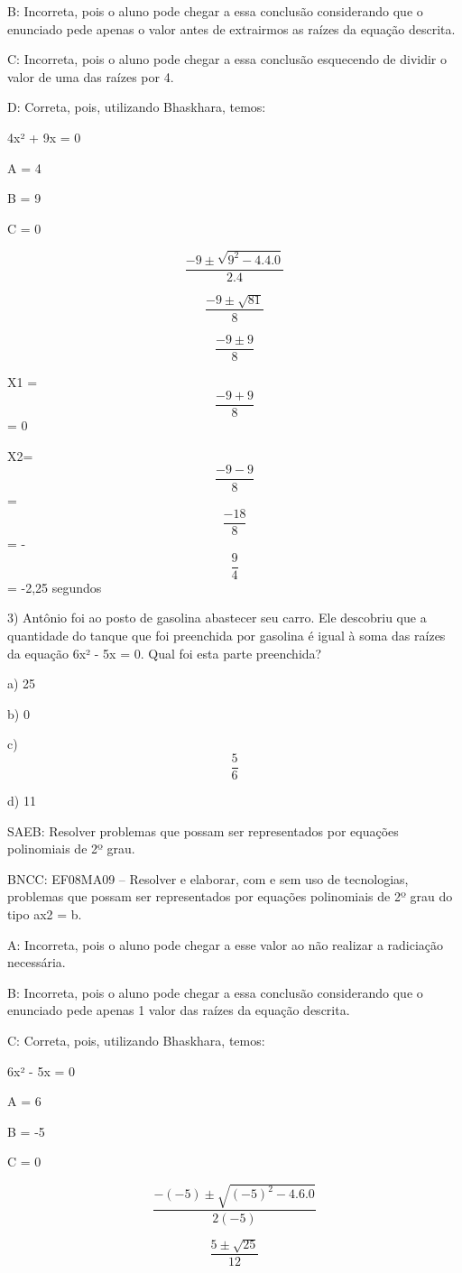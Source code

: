 B: Incorreta, pois o aluno pode chegar a essa conclusão considerando que
o enunciado pede apenas o valor antes de extrairmos as raízes da equação
descrita.

C: Incorreta, pois o aluno pode chegar a essa conclusão esquecendo de
dividir o valor de uma das raízes por 4.

D: Correta, pois, utilizando Bhaskhara, temos:

4x² + 9x = 0

A = 4

B = 9

C = 0

\[\frac{- 9 \pm \sqrt{9^{2} - 4.4.0}}{2.4}\]

\[\frac{- 9 \pm \sqrt{81}}{8}\]

\[\frac{- 9 \pm 9}{8}\]

X1 = \[\frac{- 9 + 9}{8}\] = 0

X2= \[\frac{- 9 - 9}{8}\] = \[\frac{- 18}{8}\] = - \[\frac{9}{4}\] =
-2,25 segundos

3) Antônio foi ao posto de gasolina abastecer seu carro. Ele descobriu
que a quantidade do tanque que foi preenchida por gasolina é igual à
soma das raízes da equação 6x² - 5x = 0. Qual foi esta parte preenchida?

a) 25

b) 0

c) \[\frac{5}{6}\]

d) 11

SAEB: Resolver problemas que possam ser representados por equações
polinomiais de 2º grau.

BNCC: EF08MA09 -- Resolver e elaborar, com e sem uso de tecnologias,
problemas que possam ser representados por equações polinomiais de 2º
grau do tipo ax2 = b.

A: Incorreta, pois o aluno pode chegar a esse valor ao não realizar a
radiciação necessária.

B: Incorreta, pois o aluno pode chegar a essa conclusão considerando que
o enunciado pede apenas 1 valor das raízes da equação descrita.

C: Correta, pois, utilizando Bhaskhara, temos:

6x² - 5x = 0

A = 6

B = -5

C = 0

\[\frac{- ( - 5) \pm \sqrt{{( - 5)}^{2} - 4.6.0}}{2( - 5)}\]

\[\frac{5 \pm \sqrt{25}}{12}\]

